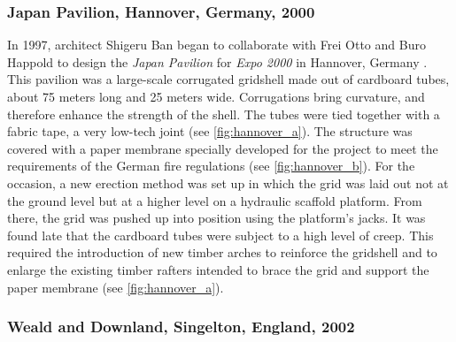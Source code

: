 \subsubsection{Japan Pavilion, Hannover, Germany, 2000}
In 1997, architect Shigeru Ban began to collaborate with Frei Otto and Buro Happold to design the \emph{Japan Pavilion} for \emph{Expo 2000} in Hannover, Germany \cite{Ban2006}. This pavilion was a large-scale corrugated gridshell made out of cardboard tubes, about 75 meters long and 25 meters wide. Corrugations bring curvature, and therefore enhance the strength of the shell. The tubes were tied together with a fabric tape, a very low-tech joint (see \cref{fig:hannover_a}). The structure was covered with a paper membrane specially developed for the project to meet the requirements of the German fire regulations (see \cref{fig:hannover_b}). For the occasion, a new erection method was set up in which the grid was laid out not at the ground level but at a higher level on a hydraulic scaffold platform. From there, the grid was pushed up into position using the platform's jacks. It was found late that the cardboard tubes were subject to a high level of creep. This required the introduction of new timber arches to reinforce the gridshell and to enlarge the existing timber rafters intended to brace the grid and support the paper membrane (see \cref{fig:hannover_a}).

\subsubsection{Weald and Downland, Singelton, England, 2002}


